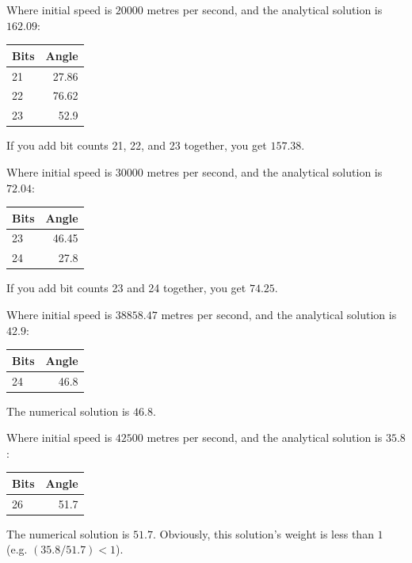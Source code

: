 \documentclass[12pt]{article}
\begin{document}
Where initial speed is $20000$ metres per second, and the analytical solution is $162.09$:
\begin{center}
\begin{tabular}{| l | r |}
  \hline
Bits & Angle \\
\hline
\hline
21 & 27.86 \\
22 & 76.62 \\
23 & 52.9 \\
  \hline  
\end{tabular}
\end{center}
If you add bit counts 21, 22, and 23 together, you get $157.38$.

Where initial speed is $30000$ metres per second, and the analytical solution is $72.04$:
\begin{center}
\begin{tabular}{| l | r |}
  \hline
Bits & Angle \\
\hline
\hline
23 & 46.45 \\
24 & 27.8 \\
  \hline  
\end{tabular}
\end{center}
If you add bit counts 23 and 24 together, you get $74.25$.

Where initial speed is $38858.47$ metres per second, and the analytical solution is $42.9$:
\begin{center}
\begin{tabular}{| l | r |}
  \hline
Bits & Angle \\
\hline
\hline
24 & 46.8 \\
  \hline  
\end{tabular}
\end{center}
The numerical solution is $46.8$.

Where initial speed is $42500$ metres per second, and the analytical solution is $35.8$:
\begin{center}
\begin{tabular}{| l | r |}
  \hline
Bits & Angle \\
\hline
\hline
26 & 51.7 \\
  \hline  
\end{tabular}
\end{center}
The numerical solution is $51.7$.
Obviously, this solution's weight is less than $1$ (e.g. $(35.8 / 51.7) < 1$).
\end{document}
